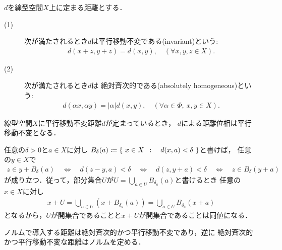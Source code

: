 	\begin{screen}
		\begin{dfn}
			$d$を線型空間$X$上に定まる距離とする．
			\begin{description}
				\item[(1)] 次が満たされるとき$d$は平行移動不変である(invariant)という:
					\begin{align}
						d(x+z, y+z) = d(x,y),\quad (\forall x,y,z \in X).
					\end{align}
					
				\item[(2)]  次が満たされるとき$d$は
					絶対斉次的である(absolutely homogeneous)という:
					\begin{align}
						d(\alpha x, \alpha y) = |\alpha| d(x,y),
						\quad (\forall \alpha \in \Phi,\ x,y \in X).
					\end{align}
			\end{description}
		\end{dfn}
	\end{screen}
	
	\begin{screen}
		\begin{thm}[平行移動不変距離による距離位相は平行移動不変]
			線型空間$X$に平行移動不変距離$d$が定まっているとき，
			$d$による距離位相は平行移動不変となる．
		\end{thm}
	\end{screen}
	
	\begin{prf}
		任意の$\delta>0$と$a \in X$に対し
		$B_\delta(a) \coloneqq \left\{\ x \in X\ \, : \quad d(x,a) < \delta\ \right\}$と書けば，
		任意の$y \in X$で
		\begin{align}
			z \in y + B_\delta(a)
			\quad \Longleftrightarrow \quad
			d(z-y,a) < \delta
			\quad \Longleftrightarrow \quad
			d(z,y+a) < \delta
			\quad \Longleftrightarrow \quad
			z \in B_\delta(y+a)
		\end{align}
		が成り立つ．従って，部分集合$U$が$U = \bigcup_{a \in U}B_{\delta_a}(a)$と書けるとき
		任意の$x \in X$に対し
		\begin{align}
			x + U = \bigcup_{a \in U} \left(x+B_{\delta_a}(a)\right)
			= \bigcup_{a \in U} B_{\delta_a}(x+a)
		\end{align}
		となるから，$U$が開集合であることと$x + U$が開集合であることは同値になる．
		\QED
	\end{prf}
	
	\begin{screen}
		\begin{thm}[ノルムで定める距離は唯一の絶対斉次的かつ平行移動不変な距離]
			ノルムで導入する距離は絶対斉次的かつ平行移動不変であり，逆に
			絶対斉次的かつ平行移動不変な距離はノルムを定める．
		\end{thm}
	\end{screen}
	
